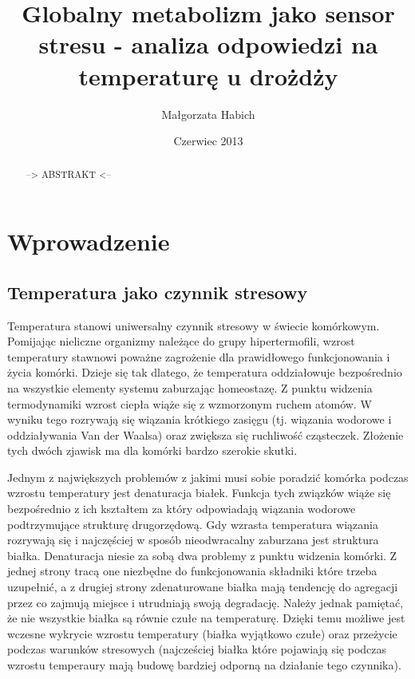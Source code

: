 \documentclass{pracamgr}
\author{Małgorzata Habich}
\title{Globalny metabolizm jako sensor stresu - analiza odpowiedzi na temperaturę u drożdży}
\date{Czerwiec 2013}
\begin{document}
\maketitle

\begin{abstract}
--> ABSTRAKT <--
\end{abstract}

\tableofcontents

\chapter{Wprowadzenie}

\section{Temperatura jako czynnik stresowy}

Temperatura stanowi uniwersalny czynnik stresowy w świecie komórkowym. Pomijając nieliczne organizmy należące do grupy hipertermofili, wzrost temperatury stawnowi poważne zagrożenie
dla prawidłowego funkcjonowania i życia komórki. Dzieje się tak dlatego, że temperatura oddziałowuje bezpośrednio na wszystkie elementy systemu zaburzając homeostazę. 
Z punktu widzenia termodynamiki wzrost ciepła wiąże się z wzmorzonym ruchem atomów. W wyniku tego rozrywają się wiązania krótkiego zasięgu (tj. wiązania wodorowe i oddziaływania Van der Waalsa) oraz 
zwiększa się ruchliwość cząsteczek. Złożenie tych dwóch zjawisk ma dla komórki bardzo szerokie skutki.

Jednym z największych problemów z jakimi musi sobie poradzić komórka podczas wzrostu temperatury jest denaturacja białek. Funkcja tych związków wiąże się bezpośrednio z ich kształtem za który odpowiadają 
wiązania wodorowe podtrzymujące strukturę drugorzędową. Gdy wzrasta temperatura wiązania rozrywają się i najczęściej w sposób nieodwracalny zaburzana jest struktura białka. Denaturacja niesie za sobą
dwa problemy z punktu widzenia komórki. Z jednej strony tracą one niezbędne do funkcjonowania składniki które trzeba uzupełnić, a z drugiej strony zdenaturowane białka mają tendencję
do agregacji przez co zajmują miejsce i utrudniają swoją degradację. Należy jednak pamiętać, że nie wszystkie białka są równie czułe na temperaturę. Dzięki temu możliwe jest wczesne wykrycie wzrostu temperatury (białka
wyjątkowo czułe) oraz przeżycie podczas warunków stresowych (najcześciej białka które pojawiają się podczas wzrostu temperaury mają budowę bardziej odporną na działanie tego czynnika)\cite{TsInEubact}.
\end{document}
